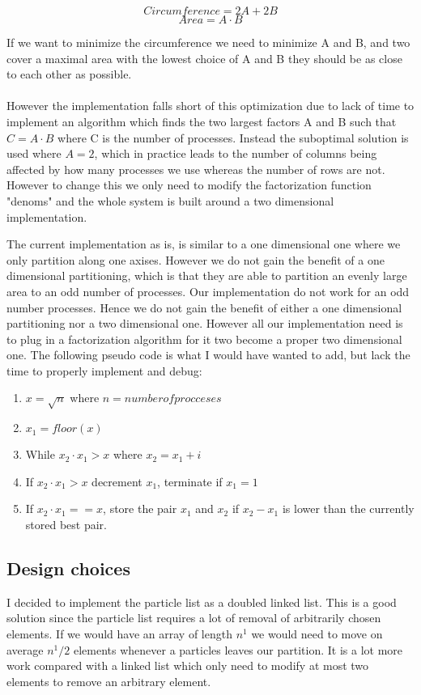 \documentclass{article}
\begin{document}
$$Circumference = 2A + 2B$$
$$Area = A \cdot B$$

If we want to minimize the circumference we need to minimize A and B, and two cover a maximal area with the lowest choice of A and B they should be as close to each other as possible. \\ \\

However the implementation falls short of this optimization due to lack of time to implement an algorithm which finds the two largest factors A and B such that $C = A \cdot B$ where C is the number of processes. Instead the suboptimal solution is used where $A = 2$, which in practice leads to the number of columns being affected by how many processes we use whereas the number of rows are not. However to change this we only need to modify the factorization function "denoms" and the whole system is built around a two dimensional implementation.


The current implementation as is, is similar to a one dimensional one where we only partition along one axises. However we do not gain the benefit of a one dimensional partitioning, which is that they are able to partition an evenly large area to an odd number of processes. Our implementation do not work for an odd number processes. Hence we do not gain the benefit of either a one dimensional partitioning nor a two dimensional one. However all our implementation need is to plug in a factorization algorithm for it two become a proper two dimensional one. The following pseudo code is what I would have wanted to add, but lack the time to properly implement and debug:

\begin{enumerate}
	\item $x = \sqrt{n}$ where $n = number of procceses$
	\item $x_1 = floor(x)$
	\item While $x_2 \cdot x_1 > x$ where $x_2 = x_1 + i$
	\item If $x_2 \cdot x_1 > x$ decrement $x_1$, terminate if $x_1 = 1$
	\item If $x_2 \cdot x_1 == x$, store the pair $x_1$ and $x_2$ if $x_2 - x_1$ is lower than the currently stored best pair.
\end{enumerate}


\subsection{Design choices}
I decided to implement the particle list as a doubled linked list. This is a good solution since the particle list requires a lot of removal of arbitrarily chosen elements. If we would have an array of length $n^1$ we would need to move on average $n^1/2$ elements whenever a particles leaves our partition. It is a lot more work compared with a linked list which only need to modify at most two elements to remove an arbitrary element.
\end{document}
